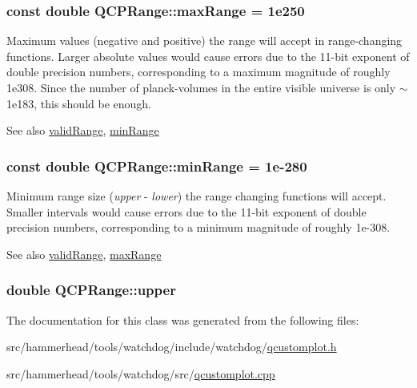 \subsubsection[{\texorpdfstring{max\+Range}{maxRange}}]{\setlength{\rightskip}{0pt plus 5cm}const double Q\+C\+P\+Range\+::max\+Range = 1e250\hspace{0.3cm}{\ttfamily [static]}}\hypertarget{classQCPRange_a5ca51e7a2dc5dc0d49527ab171fe1f4f}{}\label{classQCPRange_a5ca51e7a2dc5dc0d49527ab171fe1f4f}
Maximum values (negative and positive) the range will accept in range-\/changing functions. Larger absolute values would cause errors due to the 11-\/bit exponent of double precision numbers, corresponding to a maximum magnitude of roughly 1e308. Since the number of planck-\/volumes in the entire visible universe is only $\sim$1e183, this should be enough. \begin{DoxySeeAlso}{See also}
\hyperlink{classQCPRange_ab38bd4841c77c7bb86c9eea0f142dcc0}{valid\+Range}, \hyperlink{classQCPRange_ab46d3bc95030ee25efda41b89e2b616b}{min\+Range} 
\end{DoxySeeAlso}
\subsubsection[{\texorpdfstring{min\+Range}{minRange}}]{\setlength{\rightskip}{0pt plus 5cm}const double Q\+C\+P\+Range\+::min\+Range = 1e-\/280\hspace{0.3cm}{\ttfamily [static]}}\hypertarget{classQCPRange_ab46d3bc95030ee25efda41b89e2b616b}{}\label{classQCPRange_ab46d3bc95030ee25efda41b89e2b616b}
Minimum range size ({\itshape upper} -\/ {\itshape lower}) the range changing functions will accept. Smaller intervals would cause errors due to the 11-\/bit exponent of double precision numbers, corresponding to a minimum magnitude of roughly 1e-\/308. \begin{DoxySeeAlso}{See also}
\hyperlink{classQCPRange_ab38bd4841c77c7bb86c9eea0f142dcc0}{valid\+Range}, \hyperlink{classQCPRange_a5ca51e7a2dc5dc0d49527ab171fe1f4f}{max\+Range} 
\end{DoxySeeAlso}
\subsubsection[{\texorpdfstring{upper}{upper}}]{\setlength{\rightskip}{0pt plus 5cm}double Q\+C\+P\+Range\+::upper}\hypertarget{classQCPRange_ae44eb3aafe1d0e2ed34b499b6d2e074f}{}\label{classQCPRange_ae44eb3aafe1d0e2ed34b499b6d2e074f}


The documentation for this class was generated from the following files\+:\begin{DoxyCompactItemize}
\item 
src/hammerhead/tools/watchdog/include/watchdog/\hyperlink{qcustomplot_8h}{qcustomplot.\+h}\item 
src/hammerhead/tools/watchdog/src/\hyperlink{qcustomplot_8cpp}{qcustomplot.\+cpp}\end{DoxyCompactItemize}
